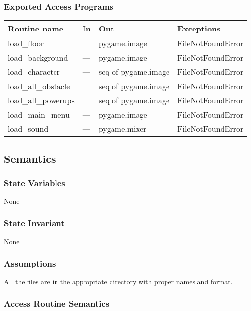 \documentclass[12pt]{article}
\begin{document}
\subsubsection* {Exported Access Programs}

\begin{tabular}{| l | l | l | l |}
\hline
\textbf{Routine name} & \textbf{In} & \textbf{Out} & \textbf{Exceptions}\\
\hline
    load\_floor & --- & pygame.image & FileNotFoundError\\
\hline
    load\_background & --- & pygame.image & FileNotFoundError\\
\hline
    load\_character & --- & seq of pygame.image & FileNotFoundError\\
\hline
load\_all\_obstacle & --- & seq of pygame.image & FileNotFoundError\\
\hline
load\_all\_powerups & --- &  seq of pygame.image & FileNotFoundError\\
\hline
load\_main\_menu & --- &   pygame.image & FileNotFoundError\\
\hline
load\_sound & --- &   pygame.mixer & FileNotFoundError\\
\hline
\end{tabular}

\subsection* {Semantics}

\subsubsection* {State Variables}

None

\subsubsection* {State Invariant}

None

\subsubsection* {Assumptions}

All the files are in the appropriate directory with proper names and format.

\subsubsection* {Access Routine Semantics}
\end{document}
